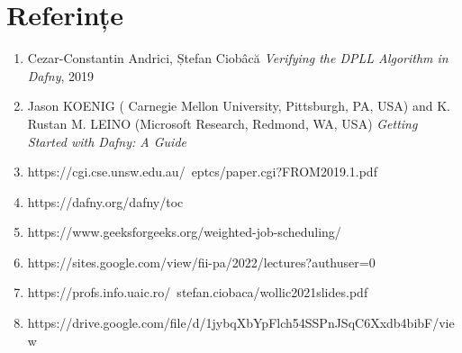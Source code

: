 \chapter*{Referințe} 

\begin{enumerate}
    \item Cezar-Constantin Andrici, Ștefan Ciobâcă
 \textit{Verifying the DPLL Algorithm in Dafny}, 2019
    \item Jason KOENIG ( Carnegie Mellon University, Pittsburgh, PA, USA)
  and K. Rustan M. LEINO 
 (Microsoft Research, Redmond, WA, USA) \textit{Getting Started with Dafny: A Guide}
    \item https://cgi.cse.unsw.edu.au/~eptcs/paper.cgi?FROM2019.1.pdf
    \item https://dafny.org/dafny/toc
    \item https://www.geeksforgeeks.org/weighted-job-scheduling/
    \item https://sites.google.com/view/fii-pa/2022/lectures?authuser=0
    \item https://profs.info.uaic.ro/~stefan.ciobaca/wollic2021slides.pdf
    \item https://drive.google.com/file/d/1jybqXbYpFlch54SSPnJSqC6Xxdb4bibF/view
\end{enumerate}